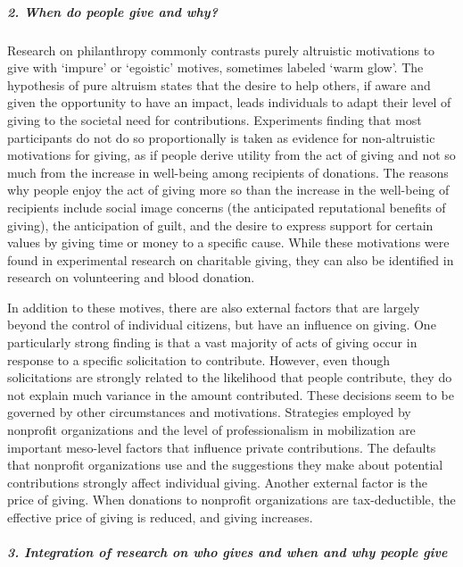 \documentclass[twocolumn, serif, rga, numeric]{jote-article}
\begin{document}
%
\subparagraph{2. When do people give and why?}

Research on philanthropy commonly contrasts purely altruistic motivations to give with `impure' or `egoistic' motives, sometimes labeled `warm glow'.\cite{Andreoni1990} The hypothesis of pure altruism states that the desire to help others, if aware and given the opportunity to have an impact, leads individuals to adapt their level of giving to the societal need for contributions. Experiments finding that most participants do not do so proportionally is taken as evidence for non-altruistic motivations for giving, as if people derive utility from the act of giving and not so much from the increase in well-being among recipients of donations.\cite{Ribar2002, -46} The reasons why people enjoy the act of giving more so than the increase in the well-being of recipients include social image concerns (the anticipated reputational benefits of giving), the anticipation of guilt, and the desire to express support for certain values by giving time or money to a specific cause.\cite{Bekkers2011b, Vesterlund2006} While these motivations were found in experimental research on charitable giving, they can also be identified in research on volunteering\cite{Bekkers2014a} and blood donation.\cite{Ferguson2015}

In addition to these motives, there are also external factors that are largely beyond the control of individual citizens, but have an influence on giving. One particularly strong finding is that a vast majority of acts of giving occur in response to a specific solicitation to contribute.\cite{Bekkers2005WashingtonDC, Musick2008} However, even though solicitations are strongly related to the likelihood that people contribute, they do not explain much variance in the amount contributed.
These decisions seem to be governed by other circumstances and motivations. Strategies employed by nonprofit organizations and the level of professionalism in mobilization are important meso-level factors that influence private contributions.\cite{Breeze2015, -56} The defaults that nonprofit organizations use and the suggestions they make about potential contributions strongly affect individual giving.\cite{57vanDalen2014vanDalen2014, -65} Another external factor is the price of giving.\cite{Bakija2011} When donations to nonprofit organizations are tax-deductible, the effective price of giving is reduced, and giving increases.\cite{Peloza2005}

\subparagraph{3. Integration of research on who gives and when and why people give}
\end{document}

